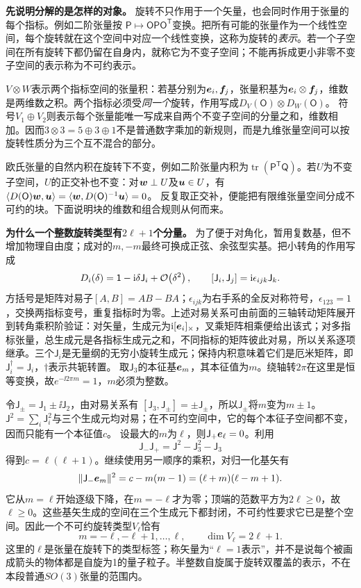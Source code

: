 \textbf{先说明分解的是怎样的对象。}
旋转不只作用于一个矢量，也会同时作用于张量的每个指标。例如二阶张量按
$\mathsf P\mapsto\mathsf O\mathsf P\mathsf O^{\mathsf T}$变换。把所有可能的张量作为一个线性空间，每个旋转就在这个空间中对应一个线性变换，这称为旋转的\emph{表示}。若一个子空间在所有旋转下都仍留在自身内，就称它为不变子空间；不能再拆成更小非零不变子空间的表示称为不可约表示。

$V\otimes W$表示两个指标空间的张量积：若基分别为$\bm{e}_i,\bm{f}_j$，张量积基为$\bm{e}_i\otimes\bm{f}_j$，维数是两维数之积。两个指标必须受\emph{同一个}旋转，作用写成$D_V(\mathsf O)\otimes D_W(\mathsf O)$。
符号$V_1\oplus V_2$则表示每个张量能唯一写成来自两个不变子空间的分量之和，维数相加。因而$3\otimes3=5\oplus3\oplus1$不是普通数字乘加的新规则，而是九维张量空间可以按旋转性质分为三个互不混合的部分。

欧氏张量的自然内积在旋转下不变，例如二阶张量内积为$\operatorname{tr}(\mathsf P^{\mathsf T}\mathsf Q)$。若$U$为不变子空间，$U$的正交补也不变：对$\bm{w}\perp U$及$\bm{u}\in U$，有
$\langle D(\mathsf O)\bm{w},\bm{u}\rangle=\langle\bm{w},D(\mathsf O)^{-1}\bm{u}\rangle=0$。
反复取正交补，便能把有限维张量空间分成不可约的块。下面说明块的维数和组合规则从何而来。

\textbf{为什么一个整数旋转类型有$2\ell+1$个分量。}
为了便于对角化，暂用复数基，但不增加物理自由度；成对的$m,-m$最终可换成正弦、余弦型实基。把小转角的作用写成
\[
 D_i(\delta)=\mathsf1-\mathrm i\delta\mathsf J_i+\mathcal O\!\left(\delta^2\right),\qquad
 [\mathsf J_i,\mathsf J_j]=\mathrm i\epsilon_{ijk}\mathsf J_k.
\]
方括号是矩阵对易子$[A,B]=AB-BA$；$\epsilon_{ijk}$为右手系的全反对称符号，$\epsilon_{123}=1$，交换两指标变号，重复指标时为零。上述对易关系可由前面的三轴转动矩阵展开到转角乘积阶验证：对矢量，生成元为$\mathrm i[\bm{e}_i]_\times$，叉乘矩阵相乘便给出该式；对多指标张量，总生成元是各指标生成元之和，不同指标的矩阵彼此对易，所以关系逐项继承。三个$\mathsf J_i$是无量纲的无穷小旋转生成元；保持内积意味着它们是厄米矩阵，即$\mathsf J_i^\dagger=\mathsf J_i$，$\dagger$表示共轭转置。
取$\mathsf J_3$的本征基$\bm{e}_m$，其本征值为$m$。绕轴转$2\pi$在这里是恒等变换，故$e^{-\ii2\pi m}=1$，$m$必须为整数。

令$\mathsf J_\pm=\mathsf J_1\pm\ii\mathsf J_2$，由对易关系有
$[\mathsf J_3,\mathsf J_\pm]=\pm\mathsf J_\pm$，所以$\mathsf J_\pm$将$m$变为$m\pm1$。
$\mathsf J^2=\sum_i\mathsf J_i^2$与三个生成元均对易；在不可约空间中，它的每个本征子空间都不变，因而只能有一个本征值$c$。
设最大的$m$为$\ell$，则$\mathsf J_+\bm{e}_\ell=0$。利用
\[
 \mathsf J_-\mathsf J_+=\mathsf J^2-\mathsf J_3^2-\mathsf J_3
\]
得到$c=\ell(\ell+1)$。继续使用另一顺序的乘积，对归一化基矢有
\[
 \|\mathsf J_-\bm{e}_m\|^2
 =c-m(m-1)=(\ell+m)(\ell-m+1).
\]
它从$m=\ell$开始逐级下降，在$m=-\ell$才为零；顶端的范数平方为$2\ell\ge0$，故$\ell\ge0$。这些基矢生成的空间在三个生成元下都封闭，不可约性要求它已是整个空间。因此一个不可约旋转类型$V_\ell$恰有
\[
 m=-\ell,-\ell+1,\ldots,\ell,\qquad \dim V_\ell=2\ell+1.
\]
这里的$\ell$是张量在旋转下的类型标签；称矢量为“$\ell=1$表示”，并不是说每个被画成箭头的物体都是自旋为1的量子粒子。半整数自旋属于旋转双覆盖的表示，不在本段普通$SO(3)$张量的范围内。

